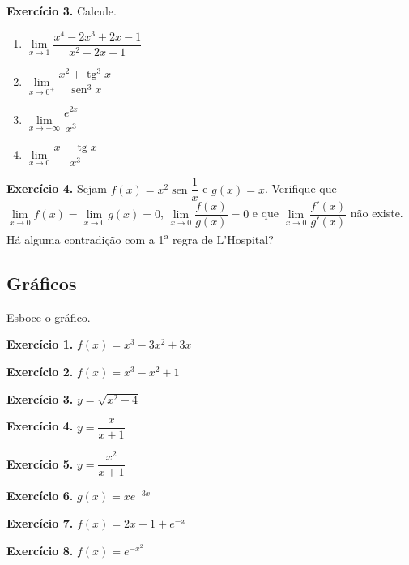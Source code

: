 \documentclass[12pt,a4paper]{article}
\begin{document}
\vspace{0.5cm}
\noindent\textbf{Exercício 3.} Calcule.
\begin{enumerate}
    \renewcommand{\theenumi}{\alph{enumi}}
    \renewcommand{\labelenumi}{\theenumi)}
    \item $\lim\limits_{x \to 1} \dfrac{x^4 - 2x^3 + 2x - 1}{x^2 - 2x + 1}$
    \item $\lim\limits_{x \to 0^+} \dfrac{x^2 + \operatorname{tg}^3 x}{\operatorname{sen}^3 x}$
    \item $\lim\limits_{x \to +\infty} \dfrac{e^{2x}}{x^3}$
    \item $\lim\limits_{x \to 0} \dfrac{x - \operatorname{tg} x}{x^3}$
\end{enumerate}

\vspace{0.5cm}
\noindent\textbf{Exercício 4.} Sejam $f(x) = x^2 \operatorname{sen}\dfrac{1}{x}$ e $g(x) = x$. Verifique que $\lim\limits_{x \to 0} f(x) = \lim\limits_{x \to 0} g(x) = 0$, $\lim\limits_{x \to 0} \dfrac{f(x)}{g(x)} = 0$ e que $\lim\limits_{x \to 0} \dfrac{f'(x)}{g'(x)}$ não existe. Há alguma contradição com a 1\textsuperscript{a} regra de L'Hospital?

\subsection{Gráficos}
\noindent Esboce o gráfico.

\vspace{0.5cm}
\noindent\textbf{Exercício 1.} $f(x) = x^3 - 3x^2 + 3x$

\vspace{0.5cm}
\noindent\textbf{Exercício 2.} $f(x) = x^3 - x^2 + 1$

\vspace{0.5cm}
\noindent\textbf{Exercício 3.} $y = \sqrt{x^2 - 4}$

\vspace{0.5cm}
\noindent\textbf{Exercício 4.} $y = \dfrac{x}{x + 1}$

\vspace{0.5cm}
\noindent\textbf{Exercício 5.} $y = \dfrac{x^2}{x + 1}$

\vspace{0.5cm}
\noindent\textbf{Exercício 6.} $g(x) = x e^{-3x}$

\vspace{0.5cm}
\noindent\textbf{Exercício 7.} $f(x) = 2x + 1 + e^{-x}$

\vspace{0.5cm}
\noindent\textbf{Exercício 8.} $f(x) = e^{-x^2}$
\end{document}
